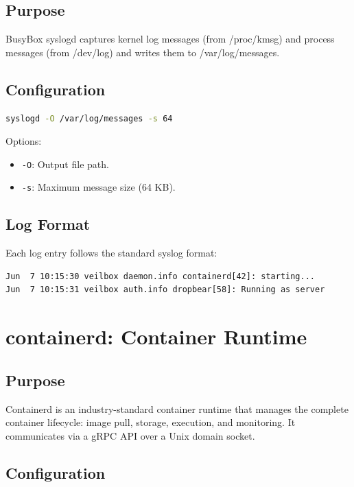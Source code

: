 \subsection{Purpose}

BusyBox syslogd captures kernel log messages (from /proc/kmsg) and process
messages (from /dev/log) and writes them to /var/log/messages.

\subsection{Configuration}

\begin{lstlisting}[language=bash]
syslogd -O /var/log/messages -s 64
\end{lstlisting}

Options:
\begin{itemize}[nosep]
  \item \texttt{-O}: Output file path.
  \item \texttt{-s}: Maximum message size (64 KB).
\end{itemize}

\subsection{Log Format}

Each log entry follows the standard syslog format:
\begin{lstlisting}
Jun  7 10:15:30 veilbox daemon.info containerd[42]: starting...
Jun  7 10:15:31 veilbox auth.info dropbear[58]: Running as server
\end{lstlisting}

\section{containerd: Container Runtime}

\subsection{Purpose}

Containerd is an industry-standard container runtime that manages the
complete container lifecycle: image pull, storage, execution, and
monitoring. It communicates via a gRPC API over a Unix domain socket.

\subsection{Configuration}

